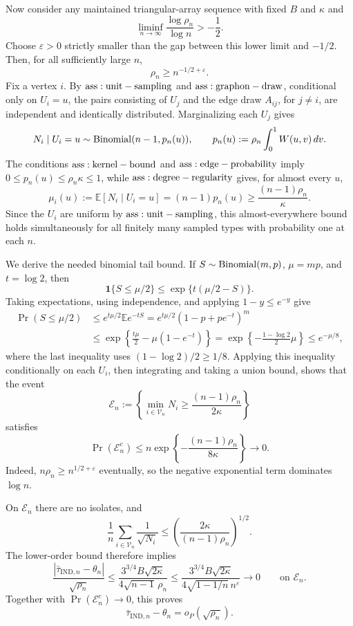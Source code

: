 Now consider any maintained triangular-array sequence with fixed \(B\) and \(\kappa\) and
\[
 \liminf_{n\to\infty}\frac{\log\rho_n}{\log n}>-\frac12.
\]
Choose \(\varepsilon>0\) strictly smaller than the gap between this lower limit and \(-1/2\).  Then, for all sufficiently large \(n\),
\[
 \rho_n\ge n^{-1/2+\varepsilon}.
\]
Fix a vertex \(i\).  By \({\rm ass:unit-sampling}\) and \({\rm ass:graphon-draw}\), conditional only on \(U_i=u\), the pairs consisting of \(U_j\) and the edge draw \(A_{ij}\), for \(j\ne i\), are independent and identically distributed.  Marginalizing each \(U_j\) gives
\[
 N_i\mid U_i=u\sim{\rm Binomial}(n-1,p_n(u)),
 \qquad
 p_n(u):=\rho_n\int_0^1W(u,v)\,dv.
\]
The conditions \({\rm ass:kernel-bound}\) and \({\rm ass:edge-probability}\) imply \(0\le p_n(u)\le\rho_n\kappa\le1\), while \({\rm ass:degree-regularity}\) gives, for almost every \(u\),
\[
 \mu_i(u):=\mathbb E[N_i\mid U_i=u]
 =(n-1)p_n(u)
 \ge\frac{(n-1)\rho_n}{\kappa}.
\]
Since the \(U_i\) are uniform by \({\rm ass:unit-sampling}\), this almost-everywhere bound holds simultaneously for all finitely many sampled types with probability one at each \(n\).

We derive the needed binomial tail bound.  If \(S\sim{\rm Binomial}(m,p)\), \(\mu=mp\), and \(t=\log2\), then
\[
 \mathbf1\{S\le\mu/2\}\le\exp\{t(\mu/2-S)\}.
\]
Taking expectations, using independence, and applying \(1-y\le e^{-y}\) give
\[
\begin{aligned}
 \Pr(S\le\mu/2)
 &\le e^{t\mu/2}\mathbb Ee^{-tS}
 =e^{t\mu/2}(1-p+pe^{-t})^m\\
 &\le\exp\!\left\{\frac{t\mu}{2}-\mu(1-e^{-t})\right\}
 =\exp\!\left\{-\frac{1-\log2}{2}\mu\right\}
 \le e^{-\mu/8},
\end{aligned}
\]
where the last inequality uses \((1-\log2)/2\ge1/8\).  Applying this inequality conditionally on each \(U_i\), then integrating and taking a union bound, shows that the event
\[
 \mathcal E_n:=\left\{\min_{i\in\mathcal V_n}N_i
 \ge\frac{(n-1)\rho_n}{2\kappa}\right\}
\]
satisfies
\[
 \Pr(\mathcal E_n^c)
 \le n\exp\!\left\{-\frac{(n-1)\rho_n}{8\kappa}\right\}
 \longrightarrow0.
\]
Indeed, \(n\rho_n\ge n^{1/2+\varepsilon}\) eventually, so the negative exponential term dominates \(\log n\).

On \(\mathcal E_n\) there are no isolates, and
\[
 \frac1n\sum_{i\in\mathcal V_n}\frac1{\sqrt{N_i}}
 \le\left(\frac{2\kappa}{(n-1)\rho_n}\right)^{1/2}.
\]
The lower-order bound therefore implies
\[
 \frac{|\bar\tau_{\mathrm{IND},n}-\theta_n|}{\sqrt{\rho_n}}
 \le\frac{3^{3/4}B\sqrt{2\kappa}}{4\sqrt{n-1}\,\rho_n}
 \le\frac{3^{3/4}B\sqrt{2\kappa}}{4\sqrt{1-1/n}\,n^\varepsilon}
 \longrightarrow0
 \qquad\text{on }\mathcal E_n.
\]
Together with \(\Pr(\mathcal E_n^c)\to0\), this proves
\[
 \bar\tau_{\mathrm{IND},n}-\theta_n=o_P(\sqrt{\rho_n}).
\]

